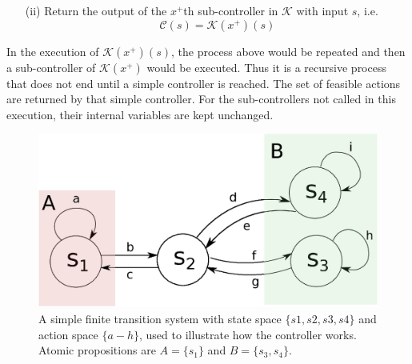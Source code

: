 \begin{definition}
\begin{itemize}
	\item[(ii)] Return the output of the $ x^+ $th sub-controller in $ \mathcal{K} $ with input $ s $, i.e.
	\begin{displaymath}
	\mathcal{C}(s) = \mathcal{K}(x^+)(s)
	\end{displaymath}
\end{itemize}
	
	In the execution of $ \mathcal{K}(x^+)(s) $, the process above would be repeated and then a sub-controller of $ \mathcal{K}(x^+) $ would be executed. Thus it is a recursive process that does not end until a simple controller is reached.
	The set of feasible actions are returned by that simple controller. For the sub-controllers not called in this execution, their internal variables are kept unchanged.
	

	\label{def:exec}
\end{definition}


\begin{figure}
	\centering
	\includegraphics[width=0.7\linewidth]{pic/eg1}
	\caption{A simple finite transition system with state space $\{s1,s2,s3,s4\}$ and action space $\{a-h\}$, used to illustrate how the controller works. Atomic propositions are $ A =\{s_1\} $ and $ B=\{s_3, s_4\} $.}
	\label{fig:eg1}
\end{figure}

